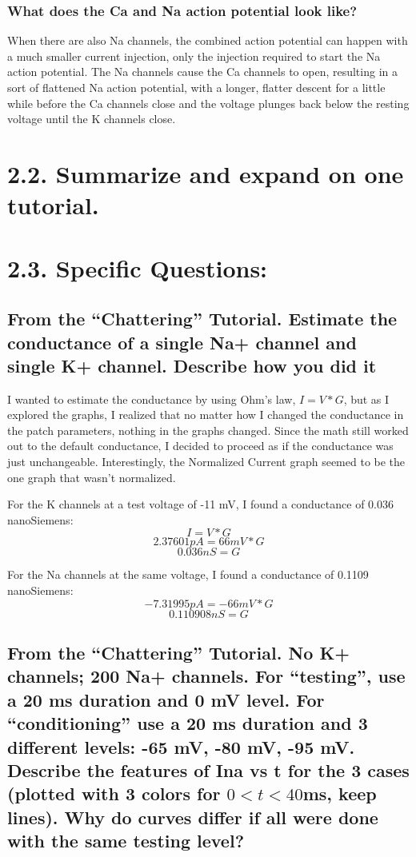 \documentclass[11pt]{article}
\begin{document}
\subsubsection{What does the Ca and Na action potential look like?}
When there are also Na channels, the combined action potential can happen with a much smaller current injection,
only the injection required to start the Na action potential.
The Na channels cause the Ca channels to open, resulting in a sort of flattened Na action potential,
with a longer, flatter descent for a little while before the Ca channels close and the voltage plunges back 
below the resting voltage until the K channels close.



\section{2.2. Summarize and expand on one tutorial.}
\section{2.3. Specific Questions:}
\subsection{From the “Chattering” Tutorial.  Estimate the conductance of a single Na+ 
channel and single K+ channel.  Describe how you did it}
I wanted to estimate the conductance by using Ohm's law, $I = V*G$, but as I explored the graphs,
I realized that no matter how I changed the conductance in the patch parameters, nothing in the graphs changed.
Since the math still worked out to the default conductance, I decided to proceed as if the conductance was just unchangeable.
Interestingly, the Normalized Current graph seemed to be the one graph that wasn't normalized.

For the K channels at a test voltage of -11 mV, I found a conductance of 0.036 nanoSiemens:
$$I = V*G$$
$$2.37601pA = 66mV*G$$
$$0.036 nS = G$$

For the Na channels at the same voltage, I found a conductance of 0.1109 nanoSiemens:
$$-7.31995 pA = -66mV*G$$
$$0.110908 nS = G$$


\subsection{From the “Chattering” Tutorial.  No K+ channels; 200 Na+ channels.  For 
“testing”, use a 20 ms duration and 0 mV level.  For “conditioning” use a 20 ms 
duration and 3 different levels:  -65 mV, -80 mV, -95 mV.  Describe the features 
of Ina vs t for the 3 cases (plotted with 3 colors for $0<t<40$ms, keep lines).  Why 
do curves differ if all were done with the same testing level?}
\end{document}
